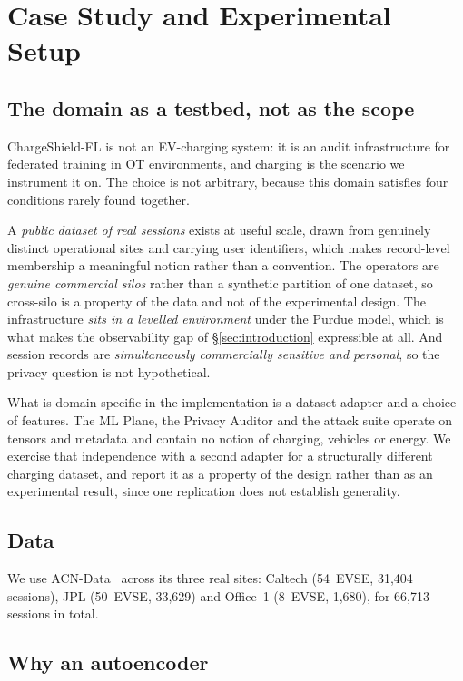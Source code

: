 \section{Case Study and Experimental Setup}
\label{sec:setup}

\subsection{The domain as a testbed, not as the scope}
\label{sec:setup-domain}

ChargeShield-FL is not an EV-charging system: it is an audit infrastructure
for federated training in OT environments, and charging is the scenario we
instrument it on. The choice is not arbitrary, because this domain satisfies
four conditions rarely found together.

A \emph{public dataset of real sessions} exists at useful scale, drawn from
genuinely distinct operational sites and carrying user identifiers, which makes
record-level membership a meaningful notion rather than a convention. The
operators are \emph{genuine commercial silos} rather than a synthetic partition
of one dataset, so cross-silo is a property of the data and not of the
experimental design. The infrastructure \emph{sits in a levelled environment}
under the Purdue model, which is what makes the observability gap of
\S\ref{sec:introduction} expressible at all. And session records are
\emph{simultaneously commercially sensitive and personal}, so the privacy
question is not hypothetical.

What is domain-specific in the implementation is a dataset adapter and a choice
of features. The ML Plane, the Privacy Auditor and the attack suite operate on
tensors and metadata and contain no notion of charging, vehicles or energy. We
exercise that independence with a second adapter for a structurally different
charging dataset, and report it as a property of the design rather than as an
experimental result, since one replication does not establish generality.

\subsection{Data}
\label{sec:setup-data}

We use ACN-Data~\cite{lee2019acndata} across its three real sites: Caltech
(54~EVSE, 31{,}404 sessions), JPL (50~EVSE, 33{,}629) and Office~1 (8~EVSE,
1{,}680), for 66{,}713 sessions in total.

\subsection{Why an autoencoder}
\label{sec:setup-model}

